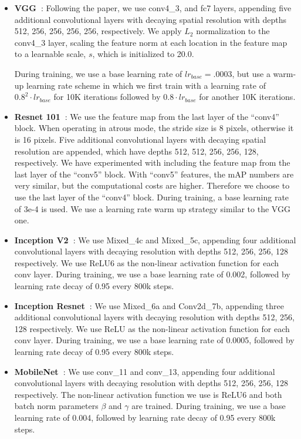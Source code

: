 \documentclass[10pt,twocolumn,letterpaper]{article}
\newcommand{\denselist}{
\itemsep -2pt\topsep-8pt\partopsep-8pt
}
\begin{document}
\begin{itemize}\denselist
\item {\bf VGG~\cite{simonyan2014very}}:
Following the paper, we use conv4\_3, and fc7 layers, appending
five additional convolutional layers with decaying spatial resolution with depths
512, 256, 256, 256, 256, respectively.
We apply $L_2$ normalization to the conv4\_3 layer, scaling the feature norm at each location in the feature map to a learnable scale, $s$, which is initialized to 20.0.


During training, we use a base learning rate of $lr_{base}=.0003$, but 
use a warm-up learning rate scheme in which we first train with a
learning rate of $0.8^2\cdot lr_{base}$ for 10K iterations followed by $0.8\cdot lr_{base}$
for another 10K iterations.

\item {\bf Resnet 101~\cite{he2015deep}}:
We use the feature map from the last layer of the ``conv4'' block. When operating in atrous mode, the stride size is 8 pixels, otherwise it is 16 pixels. Five additional convolutional layers with decaying spatial resolution are appended, which have depths 512, 512, 256, 256, 128, respectively. We have experimented with including the feature map from the last layer of the ``conv5'' block. With ``conv5'' features, the mAP numbers are very similar, but the computational costs are higher. Therefore we choose to use the  last layer of the ``conv4'' block. During training, a base learning rate of 3e-4 is used. We use a learning rate warm up strategy similar to the VGG one. 
  
\item {\bf Inception V2~\cite{ioffe2015batch}}:
We use Mixed\_4c and Mixed\_5c, appending four additional convolutional layers with decaying resolution with depths
512, 256, 256, 128 respectively. We use ReLU6 as the non-linear activation function for each conv layer.
During training, we use a base learning rate of 0.002, followed by learning rate decay of 0.95 every 800k steps.
\item {\bf Inception Resnet~\cite{szegedy2016inception}}:
We use Mixed\_6a and Conv2d\_7b, appending three additional convolutional layers with decaying resolution with depths
512, 256, 128 respectively. We use ReLU as the non-linear activation function for each conv layer.
During training, we use a base learning rate of 0.0005, followed by learning rate decay of 0.95 every 800k steps.
\item {\bf MobileNet~\cite{howard17}}:
We use conv\_11 and conv\_13, appending four additional convolutional layers with decaying resolution with depths
512, 256, 256, 128 respectively. The non-linear activation function we use is ReLU6 and both batch norm parameters
$\beta$ and $\gamma$ are trained. During training, we use a base learning rate of 0.004, followed by learning rate decay
of 0.95 every 800k steps.
\end{itemize}
\end{document}
